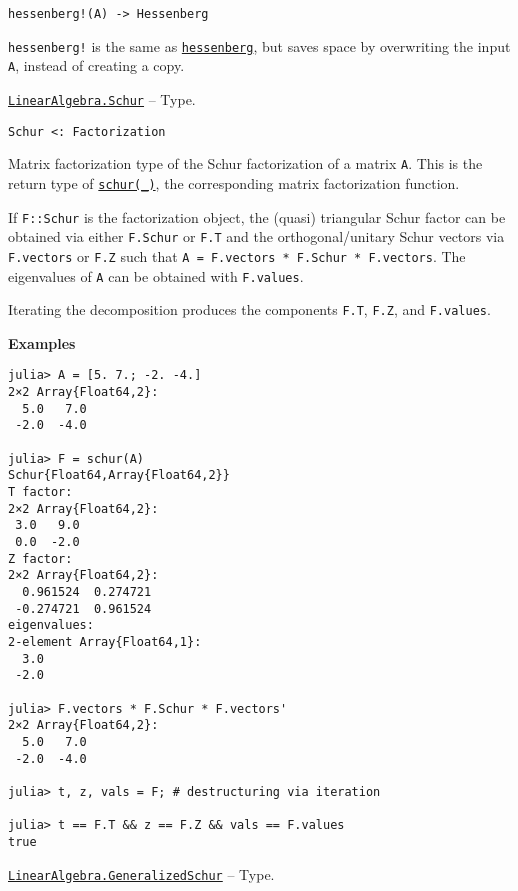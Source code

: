 \begin{adjustwidth}{2em}{0pt}


\begin{verbatim}
hessenberg!(A) -> Hessenberg
\end{verbatim}

\texttt{hessenberg!} is the same as \hyperlink{14451165250498024497}{\texttt{hessenberg}}, but saves space by overwriting the input \texttt{A}, instead of creating a copy.



\end{adjustwidth}
\hypertarget{9412476259327688170}{} 
\hyperlink{9412476259327688170}{\texttt{LinearAlgebra.Schur}}  -- {Type.}

\begin{adjustwidth}{2em}{0pt}


\begin{verbatim}
Schur <: Factorization
\end{verbatim}

Matrix factorization type of the Schur factorization of a matrix \texttt{A}. This is the return type of \hyperlink{17132870828407138368}{\texttt{schur(\_)}}, the corresponding matrix factorization function.

If \texttt{F::Schur} is the factorization object, the (quasi) triangular Schur factor can be obtained via either \texttt{F.Schur} or \texttt{F.T} and the orthogonal/unitary Schur vectors via \texttt{F.vectors} or \texttt{F.Z} such that \texttt{A = F.vectors * F.Schur * F.vectors{\textquotesingle}}. The eigenvalues of \texttt{A} can be obtained with \texttt{F.values}.

Iterating the decomposition produces the components \texttt{F.T}, \texttt{F.Z}, and \texttt{F.values}.

\textbf{Examples}


\begin{verbatim}
julia> A = [5. 7.; -2. -4.]
2×2 Array{Float64,2}:
  5.0   7.0
 -2.0  -4.0

julia> F = schur(A)
Schur{Float64,Array{Float64,2}}
T factor:
2×2 Array{Float64,2}:
 3.0   9.0
 0.0  -2.0
Z factor:
2×2 Array{Float64,2}:
  0.961524  0.274721
 -0.274721  0.961524
eigenvalues:
2-element Array{Float64,1}:
  3.0
 -2.0

julia> F.vectors * F.Schur * F.vectors'
2×2 Array{Float64,2}:
  5.0   7.0
 -2.0  -4.0

julia> t, z, vals = F; # destructuring via iteration

julia> t == F.T && z == F.Z && vals == F.values
true
\end{verbatim}



\end{adjustwidth}
\hypertarget{6518772096850576950}{} 
\hyperlink{6518772096850576950}{\texttt{LinearAlgebra.GeneralizedSchur}}  -- {Type.}


